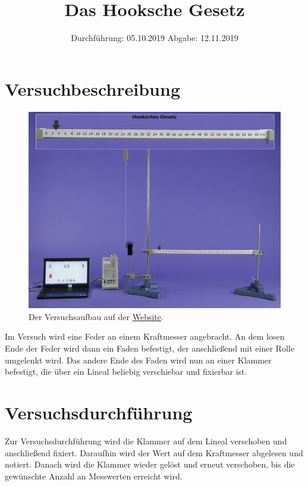

\subject{802}
\title{Das Hooksche Gesetz}
\date{%
  Durchführung: 05.10.2019
  \hspace{3em}
  Abgabe: 12.11.2019
}


\maketitle
\thispagestyle{empty}
\tableofcontents
\newpage

 \section{Versuchbeschreibung}
\begin{figure}
  \centering
  \includegraphics[width=\textwidth]{content/Hooksche_Gesetzt.png}
  \caption{Der Versuchsaufbau auf der \href{http://hyperion.didaktik.physik.uni-due.de/IBEs/Hooke.php}{Website}.}
  \label{fig:Versuchsaufbau}
\end{figure}
Im Versuch wird eine Feder an einem Kraftmesser angebracht. An dem losen Ende der Feder
wird dann ein Faden befestigt, der anschließend mit einer Rolle umgelenkt wird. 
Das andere Ende des Faden wird nun an einer Klammer befestigt,
die über ein Lineal beliebig verschiebar und fixierbar ist.
  \section{Versuchsdurchführung}
Zur Versuchsdurchführung wird die Klammer auf dem Lineal verschoben und anschließend fixiert.
Daraufhin wird der Wert auf dem Kraftmesser abgelesen und notiert.
Danach wird die Klammer wieder gelöst und erneut verschoben, bis die gewünschte Anzahl an Messwerten erreicht wird.
